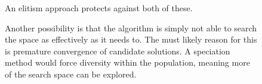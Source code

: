 \begin{figure}
    An elitism approach protects against both of these. \newline
    
    Another possibility is that the algorithm is simply not able to search the space as effectively as it needs to. The must likely reason for this is premature convergence of candidate solutions. A speciation method would force diversity within the population, meaning more of the search space can be explored.
    
\end{figure}